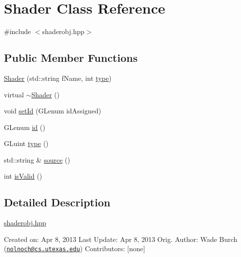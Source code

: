 \hypertarget{classShader}{\section{Shader Class Reference}
\label{classShader}
}


{\ttfamily \#include $<$shaderobj.\-hpp$>$}

\subsection*{Public Member Functions}
\begin{DoxyCompactItemize}
\item 
\hyperlink{classShader_a181d263cfc064acf22530f7118ba03a4}{Shader} (std\-::string f\-Name, int \hyperlink{classShader_ac4746e902a91f52548c588f3adb42f1a}{type})
\item 
virtual \hyperlink{classShader_aff01df87e8a102f270b5b135a295e59d}{$\sim$\-Shader} ()
\item 
void \hyperlink{classShader_a1dca74f97ac0d0d0da0367c9cfd7534d}{set\-Id} (G\-Lenum id\-Assigned)
\item 
G\-Lenum \hyperlink{classShader_ac0b61429aabf6baf4a58bae99c7d758d}{id} ()
\item 
G\-Luint \hyperlink{classShader_ac4746e902a91f52548c588f3adb42f1a}{type} ()
\item 
std\-::string \& \hyperlink{classShader_a50c4a4e3b42f80d7242091b307a52989}{source} ()
\item 
int \hyperlink{classShader_afdb38a3cb7674c7319fe0f4912e9f781}{is\-Valid} ()
\end{DoxyCompactItemize}


\subsection{Detailed Description}
\hyperlink{shaderobj_8hpp_source}{shaderobj.\-hpp}

Created on\-: Apr 8, 2013 Last Update\-: Apr 8, 2013 Orig. Author\-: Wade Burch (\href{mailto:nolnoch@cs.utexas.edu}{\tt nolnoch@cs.\-utexas.\-edu}) Contributors\-: \mbox{[}none\mbox{]} 

